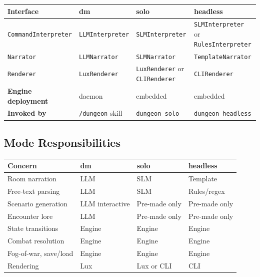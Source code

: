 \documentclass[a4paper,10pt]{article}
\newcommand{\iface}[1]{\texttt{#1}}
\newcommand{\cmd}[1]{\texttt{#1}}
\begin{document}
\begin{center}
\begin{tabular}{llll}
\toprule
\textbf{Interface} & \textbf{dm} & \textbf{solo} & \textbf{headless} \\
\midrule
\iface{CommandInterpreter}
  & \texttt{LLMInterpreter}
  & \texttt{SLMInterpreter}
  & \texttt{SLMInterpreter} or \texttt{RulesInterpreter} \\
\iface{Narrator}
  & \texttt{LLMNarrator}
  & \texttt{SLMNarrator}
  & \texttt{TemplateNarrator} \\
\iface{Renderer}
  & \texttt{LuxRenderer}
  & \texttt{LuxRenderer} or \texttt{CLIRenderer}
  & \texttt{CLIRenderer} \\
\textbf{Engine deployment}
  & daemon
  & embedded
  & embedded \\
\midrule
\textbf{Invoked by}
  & \cmd{/dungeon} skill
  & \cmd{dungeon solo}
  & \cmd{dungeon headless} \\
\bottomrule
\end{tabular}
\end{center}

\subsection{Mode Responsibilities}

\begin{center}
\begin{tabular}{lp{2.8cm}p{2.8cm}p{2.8cm}}
\toprule
\textbf{Concern} & \textbf{dm} & \textbf{solo} & \textbf{headless} \\
\midrule
Room narration        & LLM             & SLM             & Template \\
Free-text parsing     & LLM             & SLM             & Rules/regex \\
Scenario generation   & LLM interactive & Pre-made only   & Pre-made only \\
Encounter lore        & LLM             & Pre-made only   & Pre-made only \\
State transitions     & Engine          & Engine          & Engine \\
Combat resolution     & Engine          & Engine          & Engine \\
Fog-of-war, save/load & Engine          & Engine          & Engine \\
Rendering             & Lux             & Lux or CLI      & CLI \\
\bottomrule
\end{tabular}
\end{center}
\end{document}
